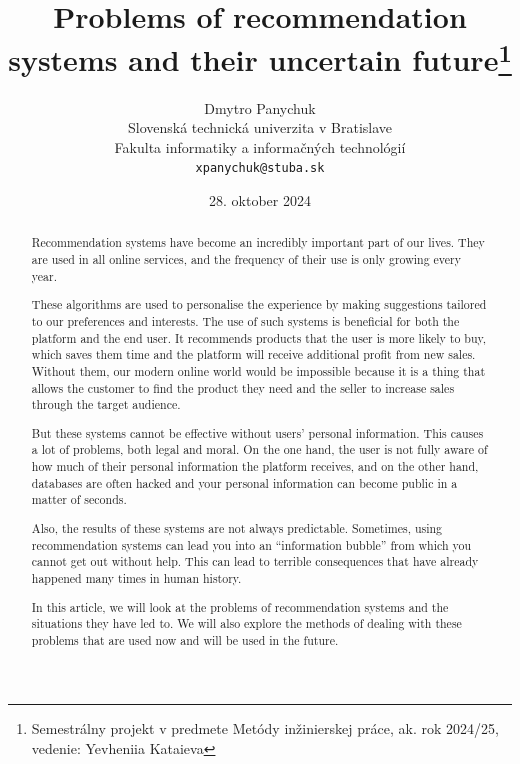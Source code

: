 \documentclass[10pt,twoside,slovak,a4paper]{article}
\title{Problems of recommendation systems and their uncertain future\thanks{Semestrálny projekt v predmete Metódy inžinierskej práce, ak. rok 2024/25, vedenie: Yevheniia Kataieva }}
\author{Dmytro Panychuk\\[2pt]
	{\small Slovenská technická univerzita v Bratislave}\\
	{\small Fakulta informatiky a informačných technológií}\\
	{\small \texttt{xpanychuk@stuba.sk}}
	}
\date{\small 28. oktober 2024}
\begin{document}
\maketitle

\begin{abstract}
\centering



Recommendation systems have become an incredibly important part of our lives. They are used in all online services, and the frequency of their use is only growing every year. 

These algorithms are used to personalise the experience by making suggestions tailored to our preferences and interests. The use of such systems is beneficial for both the platform and the end user. It recommends products that the user is more likely to buy, which saves them time and the platform will receive additional profit from new sales.  Without them, our modern online world would be impossible because it is a thing that allows the customer to find the product they need and the seller to increase sales through the target audience.

But these systems cannot be effective without users' personal information. This causes a lot of problems, both legal and moral. On the one hand, the user is not fully aware of how much of their personal information the platform receives, and on the other hand, databases are often hacked and your personal information can become public in a matter of seconds.

Also, the results of these systems are not always predictable. Sometimes, using recommendation systems can lead you into an “information bubble” from which you cannot get out without help. This can lead to terrible consequences that have already happened many times in human history. 

In this article, we will look at the problems of recommendation systems and the situations they have led to. We will also explore the methods of dealing with these problems that are used now and will be used in the future.
\newline
\newline

\end{abstract}
\end{document}
